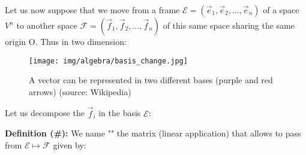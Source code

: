 	Let us now suppose that we move from a frame $\mathcal{E}=(\vec{e}_1,\vec{e}_2,...,\vec{e}_n)$ of a space $V^n$ to another space $\mathcal{F}=(\vec{f}_1,\vec{f}_2,...,\vec{f}_n)$ of this same space sharing the same origin O. Thus in two dimension:
	\begin{figure}[H]
		\centering
		\texttt{[image: img/algebra/basis\_change.jpg]}
		\caption[A vector can be represented in two different bases (purple and red arrows]{A vector can be represented in two different bases (purple and red arrows) (source: Wikipedia)}
	\end{figure}
	Let us decompose the $\vec{f}_i$ in the basis $\mathcal{E}$:
	
	\textbf{Definition (\#\mydef):} We name "" the matrix (linear application) that allows to pass from $\mathcal{E}\mapsto \mathcal{F}$ given by:
	

